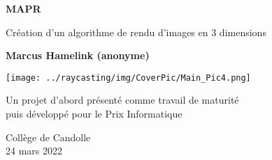 \begin{titlepage}
	\begin{center}
		\vspace*{1cm}

		\Huge
		\textbf{MAPR}

		\vspace{0.5cm}
		\LARGE
		Création d’un algorithme de rendu d’images en 3 dimensions 

		\vspace{1.5cm}

		\textbf{Marcus Hamelink (anonyme)}

		\texttt{[image: ../raycasting/img/CoverPic/Main\_Pic4.png]}

		\vfill
		Un projet d'abord présenté comme travail de maturité \\
		puis développé pour le Prix Informatique
				
		\vspace{0.8cm}
		
		\Large
		Collège de Candolle \\
		24 mars 2022
	\end{center}
\end{titlepage}



\thispagestyle{empty}
